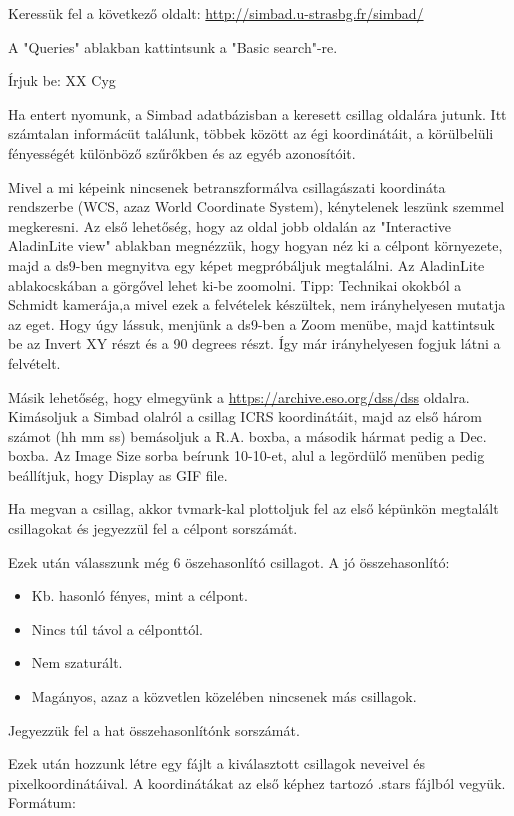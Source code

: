 \documentclass{article}
\begin{document}
Keressük fel a következő oldalt:
\url{http://simbad.u-strasbg.fr/simbad/}

A "Queries" ablakban kattintsunk a "Basic search"-re.

Írjuk be: XX Cyg

Ha entert nyomunk, a Simbad adatbázisban a keresett csillag oldalára jutunk.
Itt számtalan informácüt találunk, többek között az égi koordinátáit, a
körülbelüli fényességét különböző szűrőkben és az egyéb azonosítóit.

Mivel a mi képeink nincsenek betranszformálva csillagászati koordináta
rendszerbe (WCS, azaz World Coordinate System), kénytelenek leszünk szemmel
megkeresni.
Az első lehetőség, hogy az oldal jobb oldalán az "Interactive AladinLite view"
ablakban megnézzük, hogy hogyan néz ki a célpont környezete, majd a ds9-ben
megnyitva egy képet megpróbáljuk megtalálni. Az AladinLite ablakocskában a
görgővel lehet ki-be zoomolni.
Tipp: Technikai okokból a Schmidt kamerája,a mivel ezek a felvételek készültek,
nem irányhelyesen mutatja az eget. Hogy úgy lássuk, menjünk a ds9-ben a Zoom
menübe, majd kattintsuk be az Invert XY részt és a 90 degrees részt. Így már
irányhelyesen fogjuk látni a felvételt.

Másik lehetőség, hogy elmegyünk a \url{https://archive.eso.org/dss/dss} oldalra.
Kimásoljuk a Simbad olalról a csillag ICRS koordinátáit, majd az első három
számot (hh mm ss) bemásoljuk a R.A. boxba, a második hármat pedig a Dec. boxba.
Az Image Size sorba beírunk 10-10-et, alul a legördülő menüben pedig beállítjuk,
hogy Display as GIF file.

Ha megvan a csillag, akkor tvmark-kal plottoljuk fel az első képünkön megtalált
csillagokat és jegyezzül fel a célpont sorszámát.

Ezek után válasszunk még 6 öszehasonlító csillagot.
A jó összehasonlító:
\begin{itemize}
  \item Kb. hasonló fényes, mint a célpont.
  \item Nincs túl távol a célponttól.
  \item Nem szaturált.
  \item Magányos, azaz a közvetlen közelében nincsenek más csillagok.
\end{itemize}

Jegyezzük fel a hat összehasonlítónk sorszámát.

Ezek után hozzunk létre egy fájlt a kiválasztott csillagok neveivel és
pixelkoordinátáival. A koordinátákat az első képhez tartozó .stars fájlból
vegyük. Formátum:
\end{document}
